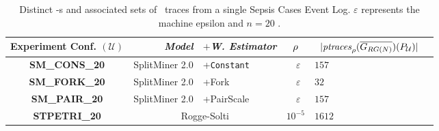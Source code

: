 \begin{table}[!t]
\caption{Distinct \uswn-s and associated sets of \unravelled\ traces from a single Sepsis Cases Event Log. $\varepsilon$ represents the machine epsilon \ifdefined\WWITHN and $n=20$ \fi.}\label{tab:dataset}
\centering
 \begin{adjustbox}{width=.6\textwidth}
	\begin{tabular}{crl||cl|c}
		\toprule
		\textbf{Experiment Conf.} $(\mathcal{U})$ & \textit{Model} & $+$\textit{W. Estimator} & $\pmin$& $\;\;|\WCal{\pmin}{n}(P_{\mathcal{U}})|$ \\
		\midrule
		
		\textbf{SM\_CONS\_20} &SplitMiner 2.0  \cite{AugustoCDRP19}       & +\texttt{Constant} &  $\;\;\varepsilon$ & $157$  \\
		
		\textbf{SM\_FORK\_20} & SplitMiner 2.0  \cite{AugustoCDRP19}      & +Fork \cite{spdwe} &  $\;\;\varepsilon$ & $32$  \\
		
		
		\textbf{SM\_PAIR\_20} & SplitMiner 2.0  \cite{AugustoCDRP19}      & +PairScale \cite{spdwe} &  $\;\;\varepsilon$ & $157$ \\

		\textbf{STPETRI\_20} & \multicolumn{2}{c||}{Rogge-Solti \cite{RoggeSoltiAW13}} &  $10^{-5}$ & $1612$ \\
		\bottomrule
	\end{tabular}
\end{adjustbox}
\end{table}
